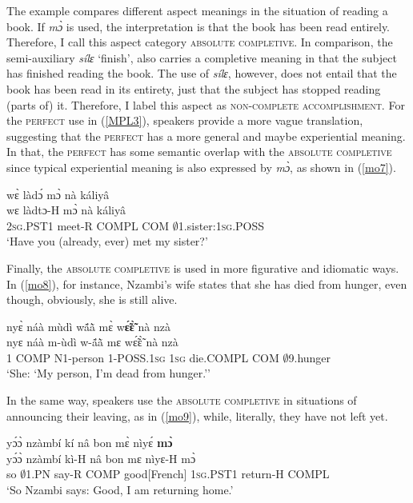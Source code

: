 \noindent The example compares different aspect meanings in the situation of reading a book. If {\itshape mɔ̀} is used, the interpretation is that the book has been read entirely. Therefore, I call this aspect category \textsc{absolute completive}. In comparison, the semi-auxiliary {\itshape sílɛ} `finish',   also carries a completive meaning in that the subject has finished reading the book. The use of {\itshape sílɛ}, however, does not entail that the book has been read in its entirety, just that the subject has stopped reading (parts of) it. Therefore, I label this aspect as \textsc{non-complete accomplishment}. For the \textsc{perfect} use in (\ref{MPL3}), speakers provide a more vague translation, suggesting that the \textsc{perfect} has a more general and maybe experiential meaning.
In that, the \textsc{perfect} has some semantic overlap with the \textsc{absolute completive} since typical experiential meaning is also expressed by {\itshape mɔ̀}, as shown in (\ref{mo7}).

\begin{exe}
\ex\label{mo7}
  \glll     wɛ̀  làdɔ́ mɔ̀ nà káliyâ \\
          wɛ  làdtɔ-H mɔ̀ nà káliyâ \\
           2\textsc{sg}.PST1  meet-R COMPL COM $\emptyset$1.sister:1\textsc{sg}.POSS  \\
    \trans `Have you (already, ever) met my sister?'
\end{exe}

Finally, the \textsc{absolute completive} is used in more figurative and idiomatic ways. In (\ref{mo8}), for instance, Nzambi's wife states that she has died from hunger, even though, obviously, she is still alive.

\begin{exe} 
\ex\label{mo8} 
  \glll  nyɛ̀ náà mùdì wã́ã̀ mɛ̀ w{\bfseries ɛ̃́ɛ̃̀} nà nzà \\
         nyɛ náà m-ùdì w-ã́ã̀ mɛ wɛ̃́ɛ̃̀ nà nzà\\
           1 COMP N1-person 1-POSS.1\textsc{sg} 1\textsc{sg} die.COMPL COM $\emptyset$9.hunger\\
    \trans `She: `My person, I'm dead from hunger.''
\end{exe}

\noindent In the same way, speakers use the \textsc{absolute completive} in situations of announcing their leaving, as in (\ref{mo9}), while, literally, they have not left yet.

\begin{exe} 
\ex\label{mo9}
  \glll yɔ́ɔ̀ nzàmbí kí nâ bon mɛ̀ nìyɛ́ {\bfseries mɔ̀} \\
        yɔ́ɔ̀ nzàmbí kì-H nâ bon mɛ nìyɛ-H mɔ̀ \\
        so $\emptyset$1.PN say-R COMP good[French] 1\textsc{sg}.PST1 return-H COMPL \\
    \trans `So Nzambi says: Good, I am returning home.'
\end{exe}


